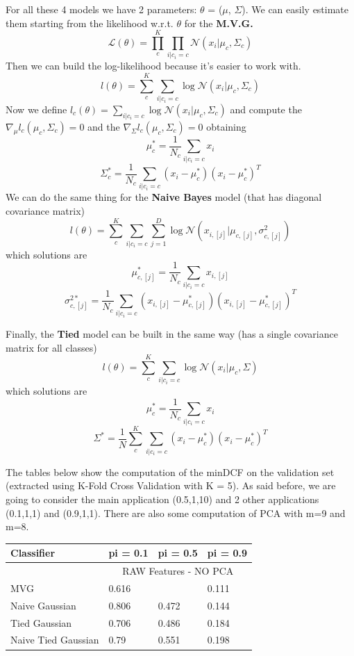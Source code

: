 \documentclass[english]{report}
\begin{document}
For all these 4 models we have 2 parameters: $\theta$ = ($\mu$, $\Sigma$). We can easily estimate them starting
from the likelihood w.r.t. $\theta$ for the \textbf{M.V.G.}
\[ \mathcal{L} (\theta) = \prod_{c}^{K}\prod_{i|c_i=c} \mathcal{N} (x_i|\mu_c,\Sigma_c)\]
Then we can build the log-likelihood because it's easier to work with.
\[ l (\theta) = \sum_{c}^{K}\sum_{i|c_i=c} \log \mathcal{N} (x_i|\mu_c,\Sigma_c)\]
Now we define \( l_c (\theta) = \sum_{i|c_i=c} \log \mathcal{N} (x_i|\mu_c,\Sigma_c)\) and compute
the $\nabla_\mu l_c(\mu_c,\Sigma_c) = 0$ and the $\nabla_\Sigma l_c(\mu_c,\Sigma_c) = 0$ 
obtaining 
\[\mu_c^* = \frac{1}{N_c}\sum_{i|c_i=c}x_i\]
\[\Sigma_c^* = \frac{1}{N_c}\sum_{i|c_i=c}(x_i-\mu_c^*)(x_i-\mu_c^*)^T\]
We can do the same thing for the \textbf{Naive Bayes} model (that has diagonal covariance matrix)
\[ l (\theta) = \sum_{c}^{K}\sum_{i|c_i=c}\sum_{j=1}^{D} \log \mathcal{N} (x_{i,[j]}|\mu_{c,[j]},\sigma^2_{c,[j]})\]
which solutions are
\[\mu_{c,[j]}^* = \frac{1}{N_c}\sum_{i|c_i=c}x_{i,[j]}\] 
\[\sigma_{c,[j]}^{2*} = \frac{1}{N_c}\sum_{i|c_i=c}(x_{i,[j]}-\mu_{c,[j]}^*)(x_{i,[j]}-\mu_{c,[j]}^*)^T\] 

Finally, the \textbf{Tied} model can be built in the same way (has a single covariance matrix for all classes)
\[ l (\theta) = \sum_{c}^{K}\sum_{i|c_i=c} \log \mathcal{N} (x_i|\mu_c,\Sigma)\]
which solutions are
\[\mu_{c}^* = \frac{1}{N_c}\sum_{i|c_i=c}x_{i}\] 
\[\Sigma^* = \frac{1}{N}\sum_{c}^{K}\sum_{i|c_i=c}(x_{i}-\mu_{c}^*)(x_{i}-\mu_{c}^*)^T\] 

The tables below show the computation of the minDCF on the validation set (extracted using K-Fold Cross Validation with K = 5).
As said before, we are going to consider the main application (0.5,1,10) and 2 other applications (0.1,1,1) and (0.9,1,1).
There are also some computation of PCA with m=9 and m=8.

\begin{table}[H]
    \centering
    \begin{tabular}{@{}llll@{}}
    \toprule
    Classifier          & pi = 0.1  & pi = 0.5  & pi = 0.9 \\ \midrule
                        & \multicolumn{3}{c}{RAW Features - NO PCA} \\ \midrule
    MVG                 & 0.616     & \color{red}{0.331}     & 0.111    \\
    Naive Gaussian      & 0.806     & 0.472     & 0.144    \\
    Tied Gaussian       & 0.706     & 0.486     & 0.184    \\
    Naive Tied Gaussian & 0.79      & 0.551     & 0.198    \\ \bottomrule
    \end{tabular}
    \label{tab:MVG_RAW_valid}
\end{table}
\end{document}

